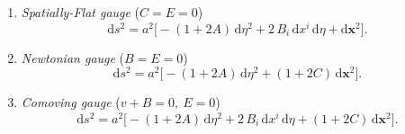 \documentclass[twocolumn,superscriptaddress,aps,preprintnumbers,amsmath,amssymb,prl,footinbib]{revtex4-2}
\begin{document}
\begin{enumerate}
    \item \textit{Spatially-Flat gauge} ($C=E=0$)
    \begin{equation}
    \label{eq:SF_gauge}
        \mathrm{d}s^2
        =
        a^2 \bigl[
        -(1 + 2A)\,\mathrm{d}\eta^2
        + 2\,B_i\,\mathrm{d}x^i\,\mathrm{d}\eta
        + \mathrm{d}\mathbf{x}^2
        \bigr].
    \end{equation}

    \item \textit{Newtonian gauge} ($B=E=0$)
    \begin{equation}
    \label{eq:Newtonian_gauge}
        \mathrm{d}s^2
        =
        a^2 \bigl[
        -(1 + 2A)\,\mathrm{d}\eta^2
        + (1 + 2C)\,\mathrm{d}\mathbf{x}^2
        \bigr].
    \end{equation}

    \item \textit{Comoving gauge} ($v + B = 0,~ E=0$)
    \begin{equation}
    \label{eq:Comoving_gauge}
        \mathrm{d}s^2
        =
        a^2\bigl[
        -(1 + 2A)\,\mathrm{d}\eta^2
        + 2\,B_i\,\mathrm{d}x^i\,\mathrm{d}\eta
        + (1 + 2C)\,\mathrm{d}\mathbf{x}^2
        \bigr].
    \end{equation}

\end{enumerate}
\end{document}
